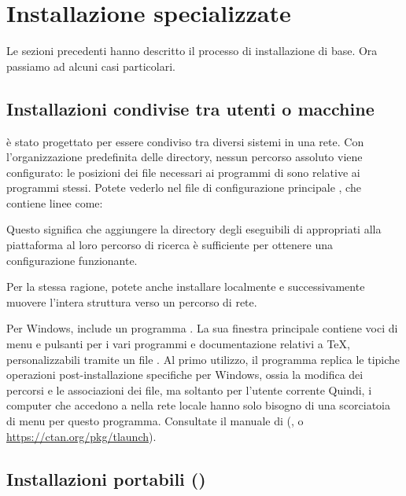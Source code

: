 \documentclass{article}
\begin{document}
\section{Installazione specializzate}

Le sezioni precedenti hanno descritto il processo di installazione di base.
Ora passiamo ad alcuni casi particolari.

\subsection{Installazioni condivise tra utenti o macchine}
\label{sec:sharedinstall}

\TL{} è stato progettato per essere condiviso tra diversi sistemi in una
rete. Con l'organizzazione predefinita delle directory, nessun percorso
assoluto viene configurato: le posizioni dei file necessari ai programmi di
\TL{} sono relative ai programmi stessi. Potete vederlo nel file di
configurazione principale , che
contiene linee come:
Questo significa che aggiungere la directory degli eseguibili di \TL{}
appropriati alla piattaforma al loro percorso di ricerca è sufficiente
per ottenere una configurazione funzionante.

Per la stessa ragione, potete anche installare \TL{} localmente e
successivamente muovere l'intera struttura verso un percorso di rete.

Per Windows, \TL{} include un programma . La sua finestra
principale contiene voci di menu e pulsanti per i vari programmi e
documentazione relativi a \TeX, personalizzabili tramite un file
. Al primo utilizzo, il programma replica le tipiche operazioni
post-installazione specifiche per Windows, ossia la modifica dei percorsi
e le associazioni dei file, ma soltanto per l'utente corrente Quindi,
i computer che accedono a \TL{} nella rete locale hanno solo bisogno di una
scorciatoia di menu per questo programma. Consultate il manuale di
 (, o \url{https://ctan.org/pkg/tlaunch}).


\subsection{Installazioni portabili (\USB)} 
\label{sec:portable-tl}
\end{document}
